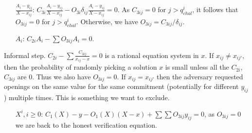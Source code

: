 \documentclass[runningheads,11pt]{llncs}
\begin{document}
\begin{itemize}
  \item[$\frac{A_{i}-y_{ij}}{X-x_{ij}}$:] $C_{3i} \frac{A_{i}-y_{ij}}{X-x_{ij}} - O_{{3i}}\delta_{ij} \frac{A_{i}-y_{ij}}{X-x_{ij}}=0$. As
    $C_{3ij}=0$ for $j>q^{i}_{chal}$, it follows that $O_{{3ij}}=0$ for $j>q^{i}_{chal}$. Otherwise, we have $O_{3ij}= C_{3ij}/\delta_{ij}$.
  \item[$A_{i}$:] $C_{2i} A_{i} - \sum O_{3ij} A_{i}=0$.
\end{itemize}

Informal step. $C_{2i}- \sum \frac{C_{3ij}}{x_{ij}-x} =0$ is a rational equation system in $x$. If $x_{ij}\neq x_{ij'}$, then the probability of randomly picking a solution $x$ is small unless all the $C_{2i}$, $C_{3ij}$ are $0$. Thus we also have $O_{{3ij}}=0$.
If $x_{ij} = x_{ij'}$ then the adversary requested openings on the same value for the same commitment (potentially for different $y_{ij}$) multiple times. This is something we want to exclude.

\begin{itemize}
        \item[$X^{i}, i\geq 0$:] $C_{1}(X) - y - O_{1}(X)(X-x) + \sum \sum O_{3ij} y_{ij} = 0$, as $O_{3ij}=0$ we are back to the honest verification equation.
\end{itemize}
\end{document}
